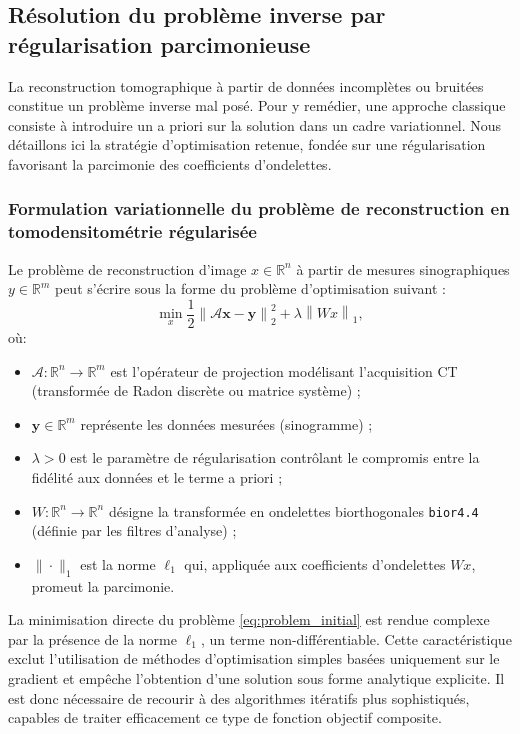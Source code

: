 \subsection{Résolution du problème inverse par régularisation parcimonieuse}
La reconstruction tomographique à partir de données incomplètes ou bruitées constitue un problème inverse mal posé. Pour y remédier, une approche classique consiste à introduire un a priori sur la solution dans un cadre variationnel. Nous détaillons ici la stratégie d'optimisation retenue, fondée sur une régularisation favorisant la parcimonie des coefficients d'ondelettes.

\subsubsection{Formulation variationnelle du problème de reconstruction en tomodensitométrie régularisée}
Le problème de reconstruction d'image $x \in \mathbb{R}^n$ à partir de mesures sinographiques $y \in \mathbb{R}^m$ peut s'écrire sous la forme du problème d'optimisation suivant :
\begin{equation}
\label{eq:problem_initial}
\min_{x} \frac{1}{2}\left\| \mathcal{A}\mathbf{x} - \mathbf{y} \right\|_{2}^{2} + \lambda \left\|Wx\right\|_{1},
\end{equation}
où:
\begin{itemize}[label=-]
    \item \(\mathcal{A} : \mathbb{R}^n \to \mathbb{R}^m\) est l'opérateur de projection modélisant l'acquisition CT (transformée de Radon discrète ou matrice système) ;
    \item \(\mathbf{y} \in \mathbb{R}^m\) représente les données mesurées (sinogramme) ;
    \item \(\lambda > 0\) est le paramètre de régularisation contrôlant le compromis entre la fidélité aux données et le terme a priori ;
    \item \(W : \mathbb{R}^n \to \mathbb{R}^n\) désigne la transformée en ondelettes biorthogonales \texttt{bior4.4} (définie par les filtres d'analyse) ;
    \item \(\|\cdot\|_1\) est la norme \(\ell_1\) qui, appliquée aux coefficients d'ondelettes \(Wx\), promeut la parcimonie.
\end{itemize}

La minimisation directe du problème \eqref{eq:problem_initial} est rendue complexe par la présence de la norme \(\ell_1\), un terme non-différentiable. Cette caractéristique exclut l'utilisation de méthodes d'optimisation simples basées uniquement sur le gradient et empêche l'obtention d'une solution sous forme analytique explicite. Il est donc nécessaire de recourir à des algorithmes itératifs plus sophistiqués, capables de traiter efficacement ce type de fonction objectif composite.

